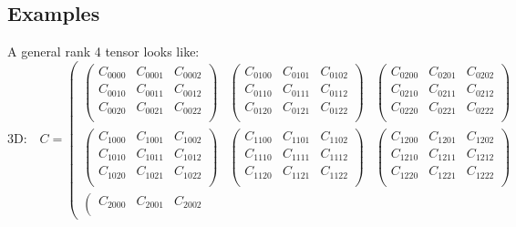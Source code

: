 \documentclass[10pt]{article}
\begin{document}
\subsection{Examples}
A general rank 4 tensor looks like:
$$
\text{3D:}\quad
C =
\left(
\begin{array}{ccc}
 \left(
\begin{array}{ccc}
 C_{0000} & C_{0001} & C_{0002} \\
 C_{0010} & C_{0011} & C_{0012} \\
 C_{0020} & C_{0021} & C_{0022} \\
\end{array}
\right) & \left(
\begin{array}{ccc}
 C_{0100} & C_{0101} & C_{0102} \\
 C_{0110} & C_{0111} & C_{0112} \\
 C_{0120} & C_{0121} & C_{0122} \\
\end{array}
\right) & \left(
\begin{array}{ccc}
 C_{0200} & C_{0201} & C_{0202} \\
 C_{0210} & C_{0211} & C_{0212} \\
 C_{0220} & C_{0221} & C_{0222} \\
\end{array}
\right) \\
 \left(
\begin{array}{ccc}
 C_{1000} & C_{1001} & C_{1002} \\
 C_{1010} & C_{1011} & C_{1012} \\
 C_{1020} & C_{1021} & C_{1022} \\
\end{array}
\right) & \left(
\begin{array}{ccc}
 C_{1100} & C_{1101} & C_{1102} \\
 C_{1110} & C_{1111} & C_{1112} \\
 C_{1120} & C_{1121} & C_{1122} \\
\end{array}
\right) & \left(
\begin{array}{ccc}
 C_{1200} & C_{1201} & C_{1202} \\
 C_{1210} & C_{1211} & C_{1212} \\
 C_{1220} & C_{1221} & C_{1222} \\
\end{array}
\right) \\
 \left(
\begin{array}{ccc}
 C_{2000} & C_{2001} & C_{2002} \\

\end{array}
\end{array}$$
\end{document}
